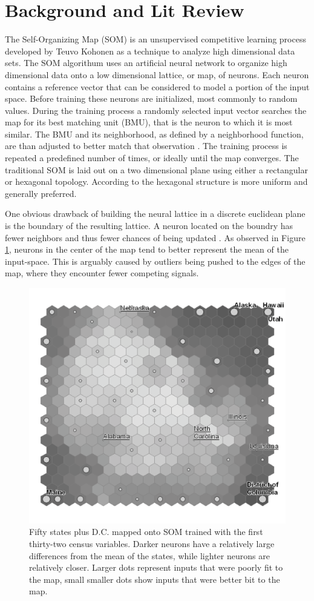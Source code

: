 \documentclass[11pt]{article}
\begin{document}
\section{Background and Lit Review}
The Self-Organizing Map (SOM) is an unsupervised competitive learning process
developed by Teuvo Kohonen as a technique to analyze high dimensional data sets.
The SOM algorithum uses an artificial neural network to organize high
dimensional data onto a low dimensional lattice, or map, of neurons.  Each
neuron contains a reference vector that can be considered to model a portion of
the input space. Before training these neurons are initialized, most commonly to
random values.  During the training process a randomly selected input vector
searches the map for its best matching unit (BMU), that is the neuron to which
it is most similar. The BMU and its neighborhood, as defined by a neighborhood
function, are than adjusted to better match that observation
\citep{Kohonen2000}.  The training process is repeated a predefined number of
times, or ideally until the map converges.  The traditional SOM is laid out on a
two dimensional plane using either a rectangular or hexagonal topology.
According to \cite{wu2006} the hexagonal structure is more uniform and
generally preferred.

One obvious drawback of building the neural lattice in a discrete euclidean
plane is the boundary of the resulting lattice.  A neuron located on the boundry
has fewer neighbors and thus fewer chances of being updated \citep{wu2006}.  As
observed in Figure \ref{figure1}, neurons in the center of the map tend to
better represent the mean of the input-space.  This is arguably caused by
outliers being pushed to the edges of the map, where they encounter fewer
competing signals.
\begin{figure}
\centering
\includegraphics[width=.6\linewidth]{gridedge_grey.pdf}
\caption{Fifty states plus D.C. mapped onto SOM trained with the first
thirty-two census variables.  Darker neurons have a relatively large differences
from the mean of the states, while lighter neurons are relatively closer.
Larger dots represent inputs that were poorly fit to the map, small smaller dots
show inputs that were better bit to the map.}
\label{figure1}
\end{figure}
\end{document}
